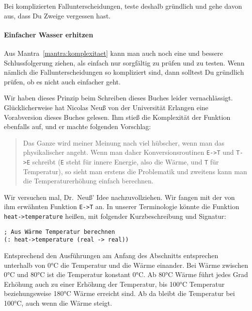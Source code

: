 \mantrakomplexitaet*

\noindent Bei komplizierten Fallunterscheidungen, teste deshalb gründlich und
gehe davon aus, dass Du Zweige vergessen hast.

\paragraph{Einfacher Wasser erhitzen}

Aus Mantra~\ref{mantra:komplexitaet} kann man auch noch eine und
bessere Schlussfolgerung ziehen, als einfach nur sorgfältig zu prüfen
und zu testen.  Wenn nämlich die Fallunterscheidungen so kompliziert
sind, dann solltest Du gründlich prüfen, ob es nicht auch einfacher
geht.

Wir haben dieses Prinzip beim Schreiben dieses Buches leider
vernachlässigt.  Glücklicherweise hat Nicolas Neuß von der Universität
Erlangen eine Vorabversion dieses Buches gelesen.  Ihm stieß die
Komplexität der Funktion ebenfalls auf, und er machte folgenden
Vorschlag:
%
\begin{quote}
  Das Ganze wird meiner Meinung nach viel hübscher, wenn man das
  physikalischer angeht.  Wenn man daher Konversionsroutinen
  \verb|E->T| und \verb|T->E| schreibt (\texttt{E} steht für innere
  Energie, also die Wärme, und \texttt{T} für Temperatur), so sieht
  man erstens die Problematik und zweitens kann man die
  Temperaturerhöhung einfach berechnen.
\end{quote}
%
Wir versuchen mal, Dr.\ Neuß' Idee nachzuvollziehen.  Wir fangen mit
der von ihm erwähnten Funktion \verb|E->T| an.  In unserer
Terminologie könnte die Funktion \lstinline{heat->temperature} heißen,
mit folgender Kurzbeschreibung und Signatur:
%
\begin{lstlisting}
; Aus Wärme Temperatur berechnen
(: heat->temperature (real -> real))
\end{lstlisting}
%
Entsprechend den Ausführungen am Anfang des Abschnitts entsprechen
unterhalb von 0\si{\degree}C die Temperatur und die Wärme einander.  Bei Wärme
zwischen 0\si{\degree}C und 80\si{\degree}C ist die Temperatur konstant 0\si{\degree}C. Ab 80\si{\degree}C Wärme
führt jedes Grad Erhöhung auch zu einer Erhöhung der Temperatur, bis
100\si{\degree}C Temperatur beziehungsweise 180\si{\degree}C Wärme erreicht sind.  Ab da
bleibt die Temperatur bei 100\si{\degree}C, auch wenn die Wärme steigt.

